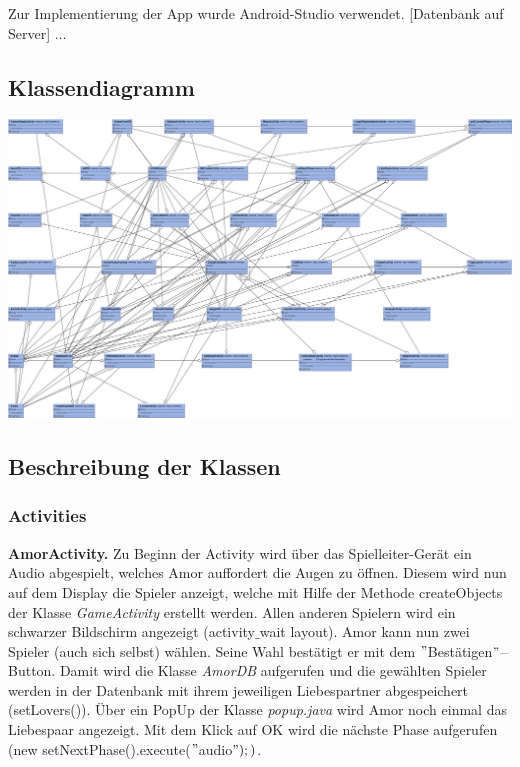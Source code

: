 \documentclass[12pt, a4paper]{article}
\begin{document}
Zur Implementierung der App wurde Android-Studio verwendet. [Datenbank auf Server] $\dots$	
		
	\subsection{Klassendiagramm}
		
\includegraphics[width = 15 cm, height = 8 cm]{WUML}
		
		
	\subsection{Beschreibung der Klassen}
		
		\subsubsection{Activities}
		
\textbf{AmorActivity.}
Zu Beginn der Activity wird über das Spielleiter-Gerät ein Audio abgespielt, welches Amor auffordert die Augen zu öffnen. Diesem wird nun auf dem Display die Spieler anzeigt, welche mit Hilfe der Methode createObjects der Klasse \textit{GameActivity} erstellt werden. Allen anderen Spielern wird ein schwarzer Bildschirm angezeigt (activity$\_$wait layout). Amor kann nun zwei Spieler (auch sich selbst) wählen. Seine Wahl bestätigt er mit dem $"$Bestätigen$" -$ Button. Damit wird die Klasse \textit{AmorDB} aufgerufen und die gewählten Spieler werden in der Datenbank mit ihrem jeweiligen Liebespartner abgespeichert (setLovers()).
Über ein PopUp der Klasse \textit{popup.java} wird Amor noch einmal das Liebespaar angezeigt. Mit dem Klick auf OK wird die nächste Phase aufgerufen (new setNextPhase().execute($"$audio$");)$.

\vspace{0,3 cm}
      
\end{document}
